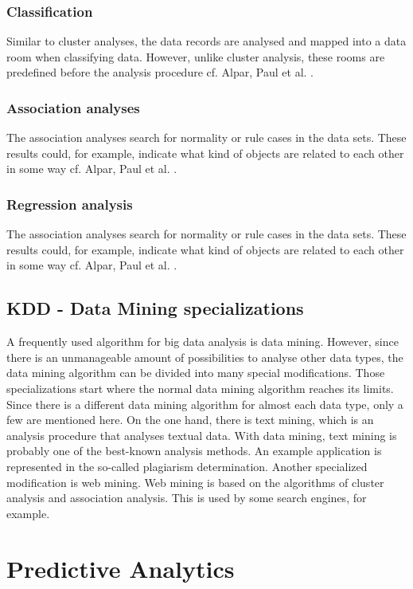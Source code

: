 \documentclass[12pt,twocolumn,twoside]{conference}   %
\begin{document}
\subsubsection{Classification}
Similar to cluster analyses, the data records are analysed and mapped into a data room when classifying data. However, unlike cluster analysis, these rooms are predefined before the analysis procedure {cf. Alpar, Paul et al. \cite{14}}.  

\subsubsection{Association analyses}
The association analyses search for normality or rule cases in the data sets. These results could, for example, indicate what kind of objects are related to each other in some way {cf. Alpar, Paul et al. \cite{14}}.

\subsubsection{Regression analysis}
The association analyses search for normality or rule cases in the data sets. These results could, for example, indicate what kind of objects are related to each other in some way {cf. Alpar, Paul et al. \cite{14}}.

\subsection{KDD - Data Mining specializations}
A frequently used algorithm for big data analysis is data mining. However, since there is an unmanageable amount of possibilities to analyse other data types, the data mining algorithm can be divided into many special modifications. Those specializations start where the normal data mining algorithm reaches its limits. Since there is a different data mining algorithm for almost each  data type, only a few are mentioned here. On the one hand, there is text mining, which is an analysis procedure that analyses textual data. With data mining, text mining is probably one of the best-known analysis methods. An example application is represented in the so-called plagiarism determination. Another specialized modification is web mining. Web mining is based on the algorithms of cluster analysis and association analysis. This is used by some search engines, for example. 


\section{Predictive Analytics}
\end{document}
